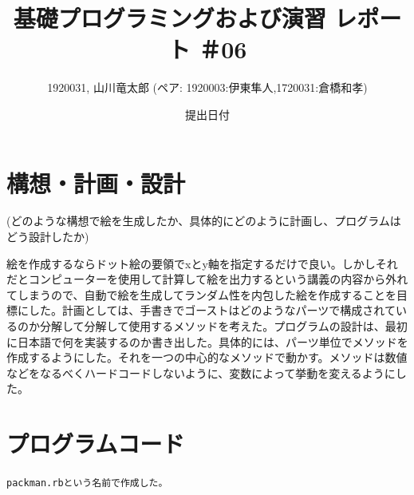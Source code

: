 \documentclass[12pt,a4j]{jarticle}
\begin{document}
\title{基礎プログラミングおよび演習 レポート ＃06}
\author{1920031, 山川竜太郎 (ペア: 1920003:伊東隼人,1720031:倉橋和孝)}
\date{提出日付}
\maketitle

\section{構想・計画・設計}

(どのような構想で絵を生成したか、具体的にどのように計画し、プログラムはどう設計したか)

絵を作成するならドット絵の要領でxとy軸を指定するだけで良い。しかしそれだとコンピューターを使用して計算して絵を出力するという講義の内容から外れてしまうので、自動で絵を生成してランダム性を内包した絵を作成することを目標にした。計画としては、手書きでゴーストはどのようなパーツで構成されているのか分解して分解して使用するメソッドを考えた。プログラムの設計は、最初に日本語で何を実装するのか書き出した。具体的には、パーツ単位でメソッドを作成するようにした。それを一つの中心的なメソッドで動かす。メソッドは数値などをなるべくハードコードしないように、変数によって挙動を変えるようにした。

\section{プログラムコード}

\verb|packman.rbという名前で作成した。|
\end{document}
